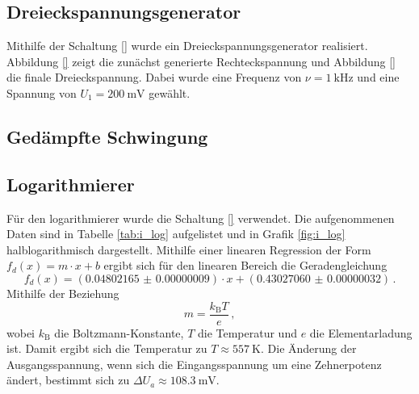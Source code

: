 \subsection{Dreieckspannungsgenerator} %
\label{sub:dreiecksgenerator}

Mithilfe der Schaltung \ref{} wurde ein Dreieckspannungsgenerator realisiert.
Abbildung \ref{} zeigt die zunächst generierte Rechteckspannung und Abbildung \ref{} die finale Dreieckspannung.
Dabei wurde eine Frequenz von $\nu = \SI{1}{\kilo\hertz}$ und eine Spannung von $U_1 = \SI{200}{\milli\volt}$ gewählt.

\subsection{Gedämpfte Schwingung} %
\label{sub:subsection_name}

\subsection{Logarithmierer} %
\label{sub:logarithmierer}

Für den logarithmierer wurde die Schaltung \ref{} verwendet.
Die aufgenommenen Daten sind in Tabelle \ref{tab:i_log} aufgelistet und in Grafik \ref{fig:i_log} halblogarithmisch dargestellt.
Mithilfe einer linearen Regression der Form $f_{d}(x) = m \cdot x + b$ ergibt sich für den linearen Bereich die Geradengleichung
\begin{equation*}
    f_{d}(x) = (\num{0.04802165(9)}) \cdot x + (\num{0.43027060(32)})\,.
\end{equation*}
Mithilfe der Beziehung
\begin{equation*}
    m = \frac{k_\mathrm{B} T}{e}\,,
\end{equation*}
wobei $k_\mathrm{B}$ die Boltzmann-Konstante, $T$ die Temperatur und $e$ die Elementarladung ist.
Damit ergibt sich die Temperatur zu $T \approx \SI{557}{\kelvin}$.
Die Änderung der Ausgangsspannung, wenn sich die Eingangsspannung um eine Zehnerpotenz ändert, bestimmt sich zu $\Delta U_a \approx \SI{108.3}{\milli\volt}$.

